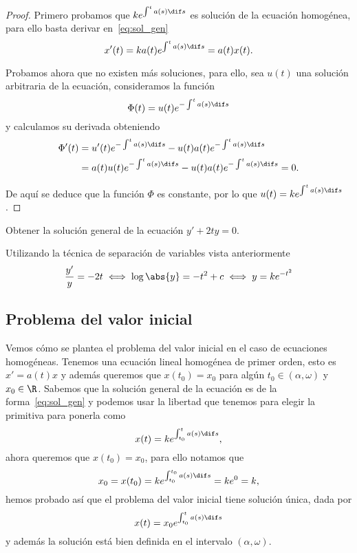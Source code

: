 \documentclass[../ecuaciones_diferenciales.tex]{subfiles}
\begin{document}
\begin{proof}
	Primero probamos que \(k e^{\int^t a(s) \dif s}\) es
	solución de la ecuación homogénea, para ello basta derivar
	en~\eqref{eq:sol_gen}
	\[x'(t) = k a(t) e^{\int^t a(s) \dif s} = a(t) x(t).\]

	Probamos ahora que no existen más soluciones, para ello, sea \(u(t)\) una
	solución arbitraria de la ecuación, consideramos la función
	\[\Phi(t) = u(t) e^{-\int^t a(s) \dif s}\]
	y calculamos su derivada obteniendo
	\begin{align*}
		\Phi'(t) & = u'(t) e^{-\int^t a(s) \dif s}
		- u(t) a(t) e^{-\int^t a(s) \dif s}            \\
		         & = a(t) u(t) e^{-\int^t a(s) \dif s}
		- u(t) a(t) e^{-\int^t a(s) \dif s} = 0.
	\end{align*}

	De aquí se deduce que la función \(\Phi\) es constante, por lo que
	\(u(t) = k e^{\int^t a(s) \dif s}\).
\end{proof}

\begin{example}
	Obtener la solución general de la ecuación \(y' + 2ty = 0\).
\end{example}

\begin{solution}
	Utilizando la técnica de separación de variables vista anteriormente
	\[\frac{y'}{y} = -2t \iff \log\abs{y} = -t^2 + c \iff y = k e^{-t^2}\]
\end{solution}

\subsection{Problema del valor inicial} \label{sec:pvi}

Vemos cómo se plantea el problema del valor inicial en el caso de ecuaciones
homogéneas. Tenemos una ecuación lineal homogénea de primer orden, esto es
\(x' = a(t)x\) y además queremos que \(x(t_0) = x_0\) para algún
\(t_0 \in (\alpha, \omega)\) y \(x_0 \in \R\).
Sabemos que la solución general de la ecuación es de la forma~\eqref{eq:sol_gen}
y podemos usar la libertad que tenemos para elegir la primitiva para ponerla como
\[x(t) = k e^{\int_{t_0}^t a(s) \dif s},\]
ahora queremos que \(x(t_0) = x_0\), para ello notamos que
\[x_0 = x(t_0) = k e^{\int_{t_0}^{t_0} a(s) \dif s} = ke^0 = k,\]
hemos probado así que el problema del valor inicial tiene solución única,
dada por
\begin{equation}
	x(t) = x_0 e^{\int_{t_0}^t a(s) \dif s} \label{eq:sol_pvi}
\end{equation}
y además la solución está bien definida en el intervalo \((\alpha, \omega)\).
\end{document}
